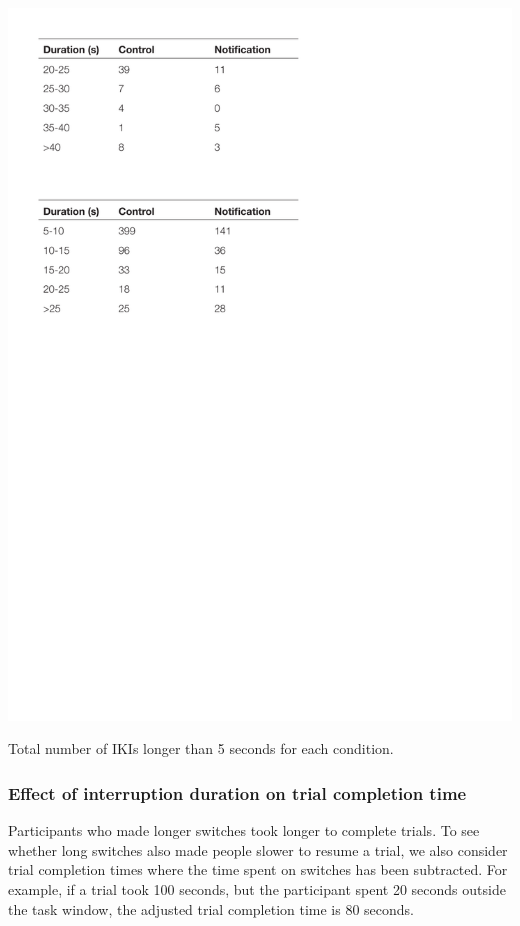 \begin{table}
\centering
\centerline{\includegraphics[scale=0.8]{images/ch56/ch56_LongIKIs.pdf}}
\caption[Study 6 frequency of long IKIs]{Total number of IKIs longer than 5 seconds for each condition.}
\label{tbl:ch56-tblikis}
\end{table}

\subsubsection{Effect of interruption duration on trial completion time}
Participants who made longer switches took longer to complete trials. To see whether long switches also made people slower to resume a trial, we also consider trial completion times where the time spent on switches has been subtracted. For example, if a trial took 100 seconds, but the participant spent 20 seconds outside the task window, the adjusted trial completion time is 80 seconds.

